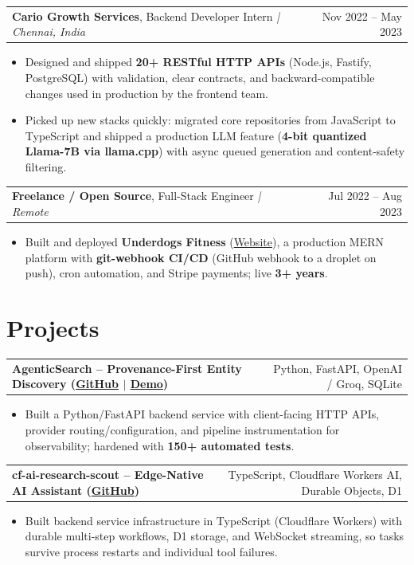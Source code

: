 \documentclass[letterpaper,11pt]{article}
\makeatletter
\newcommand{\expItem}[4]{%
  \vspace{3pt}
  \begin{tabular*}{\textwidth}{@{}l@{\extracolsep{\fill}}r@{}}
    \textbf{#1}, #2 \textit{| #3} & #4 \\
  \end{tabular*}\par\vspace{-2pt}
}
\newcommand{\projItem}[2]{%
  \vspace{6pt}
  \begin{tabular*}{\textwidth}{@{}l@{\extracolsep{\fill}}r@{}}
    \textbf{#1} & #2 \\
  \end{tabular*}\par\vspace{-2pt}
}
\makeatother
\begin{document}
\expItem{Cario Growth Services}{Backend Developer Intern}{Chennai, India}{Nov 2022 -- May 2023}
\begin{itemize}
  \item Designed and shipped \textbf{20+ RESTful HTTP APIs} (Node.js, Fastify, PostgreSQL) with validation, clear contracts, and backward-compatible changes used in production by the frontend team.
  \item Picked up new stacks quickly: migrated core repositories from JavaScript to TypeScript and shipped a production LLM feature (\textbf{4-bit quantized Llama-7B via llama.cpp}) with async queued generation and content-safety filtering.
\end{itemize}

\expItem{Freelance / Open Source}{Full-Stack Engineer}{Remote}{Jul 2022 -- Aug 2023}
\begin{itemize}
  \item Built and deployed \textbf{Underdogs Fitness} (\href{https://www.underdogsfitness.in/}{Website}), a production MERN platform with \textbf{git-webhook CI/CD} (GitHub webhook to a droplet on push), cron automation, and Stripe payments; live \textbf{3+ years}.
\end{itemize}

\section{Projects}

\projItem{AgenticSearch -- Provenance-First Entity Discovery {\normalfont\small(\href{https://github.com/Deva-1903/ciir_agentic_search}{GitHub} $\vert$ \href{https://agentic-search-negglszkwa-uc.a.run.app}{Demo})}}{Python, FastAPI, OpenAI / Groq, SQLite}
\begin{itemize}
  \item Built a Python/FastAPI backend service with client-facing HTTP APIs, provider routing/configuration, and pipeline instrumentation for observability; hardened with \textbf{150+ automated tests}.
\end{itemize}

\projItem{cf-ai-research-scout -- Edge-Native AI Assistant {\normalfont\small(\href{https://github.com/Deva-1903/cf_ai_research_scout}{GitHub})}}{TypeScript, Cloudflare Workers AI, Durable Objects, D1}
\begin{itemize}
  \item Built backend service infrastructure in TypeScript (Cloudflare Workers) with durable multi-step workflows, D1 storage, and WebSocket streaming, so tasks survive process restarts and individual tool failures.
\end{itemize}
\end{document}
